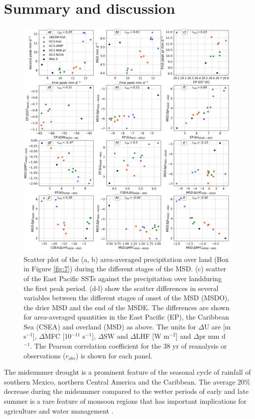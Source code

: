\section{Summary and discussion}\label{sq:sumdiscuss}


 \begin{figure}[t!]
\includegraphics[width=\linewidth]{figures/scatter}
\caption{Scatter plot of the (a, b) area-averaged precipitation over land  (Box in Figure \ref{fig:7}) during the different stages of the MSD. (c) scatter of the East Pacific SSTs against  the precipitation over landduring the first peak period. (d-l) show the scatter differences in several variables between the different stages of onset of the MSD (MSDO), the drier MSD and the end of the MSDE. The differences are shown for area-averaged quantities in the East Pacific (EP), the Caribbean Sea (CSEA) and overland (MSD) as above. The units for $\Delta$U are [m s$^{-1}$], $\Delta$MFC [10$^{-11}$ s$^{-1}$], $\Delta$SW and $\Delta$LHF [W m$^{-2}$] and $\Delta$pr mm d$^{-1}$.   The Pearson correlation coefficient for the 38 yr of  reanalysis or observations ($r_{obs}$) is shown for each panel. }
\label{fig:scatter}
\end{figure}

The midsummer drought  is a  prominent feature of the seasonal cycle of rainfall of southern Mexico, northern Central America and the Caribbean. The average 20\%  decrease during the midsummer compared to the wetter periods of early and late summer is a rare feature of monsoon regions that has important implications for agriculture and water management  \citep{hellin2017,de2018,harvey2018}. 

